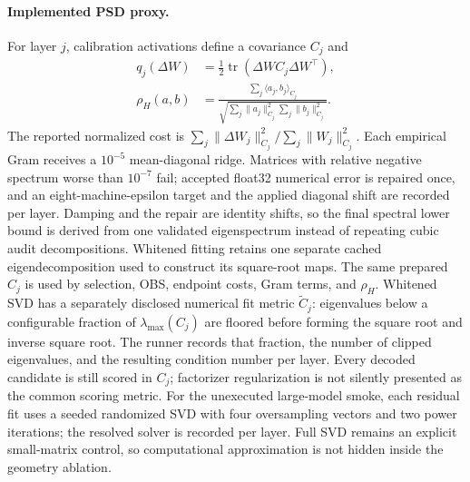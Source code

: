 \paragraph{Implemented PSD proxy.}
For layer $j$, calibration activations define a covariance $C_j$ and
\begin{equation}
 \begin{aligned}
 q_j(\Delta W)
   &=\tfrac12\operatorname{tr}(\Delta W C_j\Delta W^\top),\\
 \rho_H(a,b)
   &=\frac{\sum_j\langle a_j,b_j\rangle_{C_j}}
   {\sqrt{\sum_j\|a_j\|_{C_j}^2\sum_j\|b_j\|_{C_j}^2}}.
 \end{aligned}
 \label{eq:implemented-proxy}
\end{equation}
The reported normalized cost is
$\sum_j\|\Delta W_j\|_{C_j}^2/
 \sum_j\|W_j\|_{C_j}^2$.  Each empirical Gram receives a
$10^{-5}$ mean-diagonal ridge.  Matrices with relative negative spectrum worse
than $10^{-7}$ fail; accepted float32 numerical error is repaired once, and an
eight-machine-epsilon target and the applied diagonal shift are recorded per
layer.  Damping and the repair are identity shifts, so the final spectral
lower bound is derived from one validated eigenspectrum instead of repeating
cubic audit decompositions.  Whitened fitting retains one separate cached
eigendecomposition used to construct its square-root maps.  The same
prepared $C_j$ is used by selection, OBS, endpoint costs, Gram terms, and
$\rho_H$.  Whitened SVD has a separately disclosed numerical fit metric
$\widetilde C_j$: eigenvalues below a configurable fraction of
$\lambda_{\max}(C_j)$ are floored before forming the square root and inverse
square root.  The runner records that fraction, the number of clipped
eigenvalues, and the resulting condition number per layer.  Every decoded
candidate is still scored in $C_j$; factorizer regularization is not silently
presented as the common scoring metric.
For the unexecuted large-model smoke, each residual fit uses a seeded
randomized SVD with four oversampling vectors and two power iterations; the
resolved solver is recorded per layer.  Full SVD remains an explicit
small-matrix control, so computational approximation is not hidden inside the
geometry ablation.

